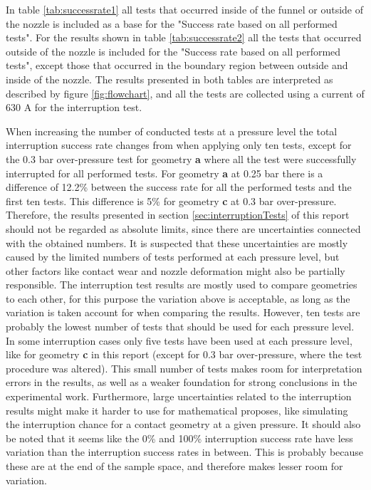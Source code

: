 \documentclass[10pt,b5paper,twoside]{article}
\begin{document}
In table \ref{tab:successrate1} all tests that occurred inside of the funnel or outside of the nozzle is included as a base for the "Success rate based on all performed tests". For the results shown in table \ref{tab:successrate2} all the tests that occurred outside of the nozzle is included for the "Success rate based on all performed tests", except those that occurred in the boundary region between outside and inside of the nozzle. The results presented in both tables are interpreted as described by figure \ref{fig:flowchart}, and all the tests are collected using a current of 630 A for the interruption test. 

When increasing the number of conducted tests at a pressure level the total interruption success rate changes from when applying only ten tests, except for the 0.3 bar over-pressure test for geometry \textbf{a} where all the test were successfully interrupted for all performed tests. For geometry \textbf{a} at 0.25 bar there is a difference of 12.2\% between the success rate for all the performed tests and the first ten tests. This difference is 5\% for geometry \textbf{c} at 0.3 bar over-pressure. Therefore, the results presented in section \ref{sec:interruptionTests} of this report should not be regarded as absolute limits, since there are uncertainties connected with the obtained numbers. It is suspected that these uncertainties are mostly caused by the limited numbers of tests performed at each pressure level, but other factors like contact wear and nozzle deformation might also be partially responsible. The interruption test results are mostly used to compare geometries to each other, for this purpose the variation above is acceptable, as long as the variation is taken account for when comparing the results. However, ten tests are probably the lowest number of tests that should be used for each pressure level. In some interruption cases only five tests have been used at each pressure level, like for geometry \textbf{c} in this report (except for 0.3 bar over-pressure, where the test procedure was altered). This small number of tests makes room for interpretation errors in the results, as well as a weaker foundation for strong conclusions in the experimental work. Furthermore, large uncertainties related to the interruption results might make it harder to use for mathematical proposes, like simulating the interruption chance for a contact geometry at a given pressure. It should also be noted that it seems like the 0\% and 100\% interruption success rate have less variation than the interruption success rates in between. This is probably because these are at the end of the sample space, and therefore makes lesser room for variation.
\end{document}
